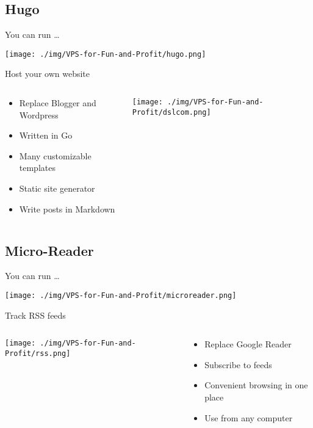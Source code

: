 \documentclass[presentation,aspectratio=169]{beamer}
\begin{document}
\subsection{Hugo}
\label{sec-4-2}
\begin{frame}[label=sec-4-2-1]{You can run \ldots{}}
\begin{center}
\texttt{[image: ./img/VPS-for-Fun-and-Profit/hugo.png]}
\end{center}
\end{frame}
\begin{frame}[label=sec-4-2-2]{Host your own website}
\begin{columns}
\begin{column}{0.35\textwidth}

\begin{itemize}
\item Replace Blogger and Wordpress
\item Written in Go
\item Many customizable templates
\item Static site generator
\item Write posts in Markdown
\end{itemize}
\end{column}

\begin{column}{0.6\textwidth}

\texttt{[image: ./img/VPS-for-Fun-and-Profit/dslcom.png]}
\end{column}
\end{columns}
\end{frame}

\subsection{Micro-Reader}
\label{sec-4-3}
\begin{frame}[label=sec-4-3-1]{You can run \ldots{}}
\begin{center}
\texttt{[image: ./img/VPS-for-Fun-and-Profit/microreader.png]}
\end{center}
\end{frame}
\begin{frame}[label=sec-4-3-2]{Track RSS feeds}
\begin{columns}
\begin{column}{0.55\textwidth}

\texttt{[image: ./img/VPS-for-Fun-and-Profit/rss.png]}
\end{column}

\begin{column}{0.45\textwidth}

\begin{itemize}
\item Replace Google Reader
\item Subscribe to feeds
\item Convenient browsing in one place
\item Use from any computer
\end{itemize}
\end{column}
\end{columns}
\end{frame}
\end{document}
